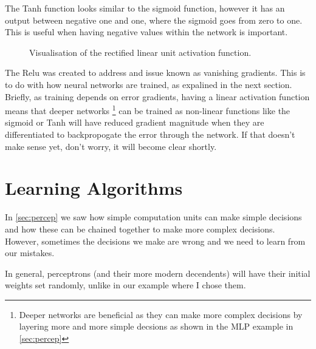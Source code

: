 The Tanh function looks similar to the sigmoid function, however it has an output between negative one and one, where the sigmoid goes from zero to one. This is useful when having negative values within the network is important.

\begin{figure}
\begin{center}
\caption{Visualisation of the rectified linear unit activation function.}
\label{fig:activation_relu}
\end{center}
\end{figure}

The Relu was created to address and issue known as vanishing gradients. This is to do with how neural networks are trained, as expalined in the next section. Briefly, as training depends on error gradients, having a linear activation function means that deeper networks \footnote{Deeper networks are beneficial as they can make more complex decisions by layering more and more simple decsions as shown in the MLP example in \autoref{sec:percep}} can be trained as non-linear functions like the sigmoid or Tanh will have reduced gradient magnitude when they are differentiated to backpropogate the error through the network. If that doesn't make sense yet, don't worry, it will become clear shortly.

\section{Learning Algorithms}
In \autoref{sec:percep} we saw how simple computation units can make simple decisions and how these can be chained together to make more complex decisions. However, sometimes the decisions we make are wrong and we need to learn from our mistakes.

In general, perceptrons (and their more modern decendents) will have their initial weights set randomly, unlike in our example where I chose them. 

